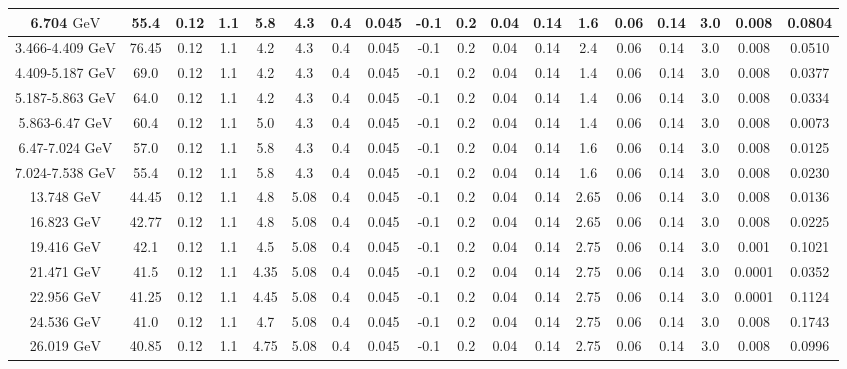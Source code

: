\documentclass[11pt]{article}
\begin{document}
\begin{table}[htbp]
{\begin{tabular}{cccccccccccccccccc}
				6.704 ${\textrm{GeV}}$ & 55.4 & 0.12 & 1.1 & 5.8 & 4.3 & 0.4 & 0.045 & -0.1 & 0.2 & 0.04 & 0.14 & 1.6 & 0.06 & 0.14 & 3.0 & 0.008 & 0.0804 \\
				\midrule
				3.466-4.409 ${\textrm{GeV}}$ & 76.45 & 0.12 & 1.1 & 4.2 & 4.3 & 0.4 & 0.045 & -0.1 & 0.2 & 0.04 & 0.14 & 2.4 & 0.06 & 0.14 & 3.0 & 0.008 & 0.0510 \\
				4.409-5.187 ${\textrm{GeV}}$ & 69.0 & 0.12 & 1.1 & 4.2 & 4.3 & 0.4 & 0.045 & -0.1 & 0.2 & 0.04 & 0.14 & 1.4 & 0.06 & 0.14 & 3.0 & 0.008 & 0.0377 \\
				5.187-5.863 ${\textrm{GeV}}$ & 64.0 & 0.12 & 1.1 & 4.2 & 4.3 & 0.4 & 0.045 & -0.1 & 0.2 & 0.04 & 0.14 & 1.4 & 0.06 & 0.14 & 3.0 & 0.008 & 0.0334 \\
				5.863-6.47 ${\textrm{GeV}}$ & 60.4 & 0.12 & 1.1 & 5.0 & 4.3 & 0.4 & 0.045 & -0.1 & 0.2 & 0.04 & 0.14 & 1.4 & 0.06 & 0.14 & 3.0 & 0.008 & 0.0073 \\
				6.47-7.024 ${\textrm{GeV}}$ & 57.0 & 0.12 & 1.1 & 5.8 & 4.3 & 0.4 & 0.045 & -0.1 & 0.2 & 0.04 & 0.14 & 1.6 & 0.06 & 0.14 & 3.0 & 0.008 & 0.0125 \\
				7.024-7.538 ${\textrm{GeV}}$ & 55.4 & 0.12 & 1.1 & 5.8 & 4.3 & 0.4 & 0.045 & -0.1 & 0.2 & 0.04 & 0.14 & 1.6 & 0.06 & 0.14 & 3.0 & 0.008 & 0.0230 \\
				\midrule
				13.748 ${\textrm{GeV}}$ & 44.45 & 0.12 & 1.1 & 4.8 & 5.08 & 0.4 & 0.045 & -0.1 & 0.2 & 0.04 & 0.14 & 2.65 & 0.06 & 0.14 & 3.0 & 0.008 & 0.0136 \\
				16.823 ${\textrm{GeV}}$ & 42.77 & 0.12 & 1.1 & 4.8 & 5.08 & 0.4 & 0.045 & -0.1 & 0.2 & 0.04 & 0.14 & 2.65 & 0.06 & 0.14 & 3.0 & 0.008 & 0.0225 \\
				19.416 ${\textrm{GeV}}$ & 42.1 & 0.12 & 1.1 & 4.5 & 5.08 & 0.4 & 0.045 & -0.1 & 0.2 & 0.04 & 0.14 & 2.75 & 0.06 & 0.14 & 3.0 & 0.001 & 0.1021 \\
				21.471 ${\textrm{GeV}}$ & 41.5 & 0.12 & 1.1 & 4.35 & 5.08 & 0.4 & 0.045 & -0.1 & 0.2 & 0.04 & 0.14 & 2.75 & 0.06 & 0.14 & 3.0 & 0.0001 & 0.0352 \\
				22.956 ${\textrm{GeV}}$ & 41.25 & 0.12 & 1.1 & 4.45 & 5.08 & 0.4 & 0.045 & -0.1 & 0.2 & 0.04 & 0.14 & 2.75 & 0.06 & 0.14 & 3.0 & 0.0001 & 0.1124 \\
				24.536 ${\textrm{GeV}}$ & 41.0 & 0.12 & 1.1 & 4.7 & 5.08 & 0.4 & 0.045 & -0.1 & 0.2 & 0.04 & 0.14 & 2.75 & 0.06 & 0.14 & 3.0 & 0.008 & 0.1743 \\
				26.019 ${\textrm{GeV}}$ & 40.85 & 0.12 & 1.1 & 4.75 & 5.08 & 0.4 & 0.045 & -0.1 & 0.2 & 0.04 & 0.14 & 2.75 & 0.06 & 0.14 & 3.0 & 0.008 & 0.0996 \\
				\bottomrule
				\bottomrule
			\end{tabular}
}
\end{table}
\end{document}

